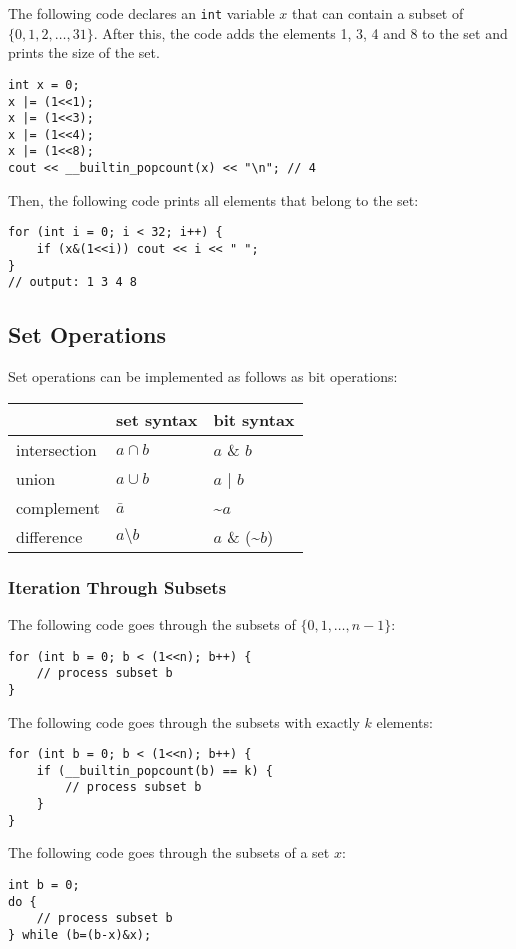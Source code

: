 \documentclass[twoside,12pt,a4paper,english]{book}
\theoremstyle{definition}
\theoremstyle{problemstyle}
\begin{document}
The following code declares an \texttt{int}
variable $x$ that can contain
a subset of $\{0,1,2,\ldots,31\}$.
After this, the code adds the elements 1, 3, 4 and 8
to the set and prints the size of the set.
\begin{lstlisting}
int x = 0;
x |= (1<<1);
x |= (1<<3);
x |= (1<<4);
x |= (1<<8);
cout << __builtin_popcount(x) << "\n"; // 4
\end{lstlisting}
Then, the following code prints all
elements that belong to the set:
\begin{lstlisting}
for (int i = 0; i < 32; i++) {
    if (x&(1<<i)) cout << i << " ";
}
// output: 1 3 4 8
\end{lstlisting}
\subsection{Set Operations}
Set operations can be implemented as follows as bit operations:

\begin{center}
\begin{tabular}{lll}
& set syntax & bit syntax \\
\hline
intersection & $a \cap b$ & $a$ \& $b$ \\
union & $a \cup b$ & $a$ | $b$ \\
complement & $\bar a$ & \textasciitilde$a$ \\
difference & $a \setminus b$ & $a$ \& (\textasciitilde$b$) \\
\end{tabular}
\end{center}
\subsubsection{Iteration Through Subsets}

The following code goes through
the subsets of $\{0,1,\ldots,n-1\}$:

\begin{lstlisting}
for (int b = 0; b < (1<<n); b++) {
    // process subset b
}
\end{lstlisting}
The following code goes through
the subsets with exactly $k$ elements:
\begin{lstlisting}
for (int b = 0; b < (1<<n); b++) {
    if (__builtin_popcount(b) == k) {
        // process subset b
    }
}
\end{lstlisting}
The following code goes through the subsets
of a set $x$:
\begin{lstlisting}
int b = 0;
do {
    // process subset b
} while (b=(b-x)&x);
\end{lstlisting}
\end{document}
